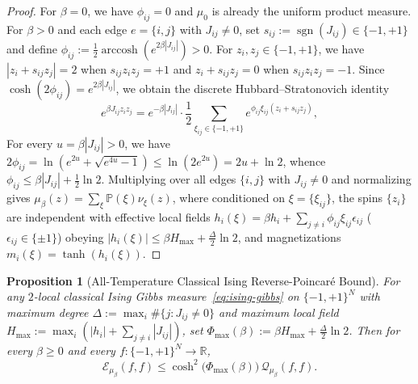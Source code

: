 \documentclass[11pt,a4paper]{article}
\numberwithin{equation}{section}
\theoremstyle{plain}
\newtheorem{proposition}[theorem]{Proposition}
\theoremstyle{definition}
\newcommand{\sgn}{\operatorname{sgn}}
\begin{document}
\begin{proof}
For $\beta = 0$, we have $\phi_{ij} = 0$ and $\mu_0$ is already the uniform product measure. For $\beta > 0$ and each edge $e = \{i,j\}$ with $J_{ij}\ne 0$, set $s_{ij} := \sgn(J_{ij})\in\{-1,+1\}$ and define $\phi_{ij} := \frac{1}{2}\operatorname{arccosh}(e^{2\beta|J_{ij}|}) > 0$. For $z_i,z_j\in\{-1,+1\}$, we have $|z_i + s_{ij}z_j| = 2$ when $s_{ij}z_i z_j = +1$ and $z_i + s_{ij}z_j = 0$ when $s_{ij}z_i z_j = -1$. Since $\cosh(2\phi_{ij}) = e^{2\beta|J_{ij}|}$, we obtain the discrete Hubbard--Stratonovich identity
\[
  e^{\beta J_{ij} z_i z_j}
  = e^{-\beta|J_{ij}|}\cdot \frac{1}{2}\sum_{\xi_{ij}\in\{-1,+1\}} e^{\phi_{ij}\xi_{ij}(z_i + s_{ij}z_j)},
\]
For every $u = \beta|J_{ij}| > 0$, we have $2\phi_{ij} = \ln(e^{2u}+\sqrt{e^{4u}-1}) \le \ln(2e^{2u}) = 2u + \ln 2$, whence $\phi_{ij} \le \beta|J_{ij}| + \frac{1}{2}\ln 2$. Multiplying over all edges $\{i,j\}$ with $J_{ij}\ne 0$ and normalizing gives $\mu_\beta(z) = \sum_\xi \mathbb{P}(\xi)\nu_\xi(z)$, where conditioned on $\xi = \{\xi_{ij}\}$, the spins $\{z_i\}$ are independent with effective local fields $h_i(\xi) = \beta h_i + \sum_{j\ne i} \phi_{ij}\xi_{ij}\epsilon_{ij}$ ($\epsilon_{ij}\in\{\pm 1\}$) obeying $|h_i(\xi)| \le \beta H_{\max} + \frac{\Delta}{2}\ln 2$, and magnetizations $m_i(\xi) = \tanh(h_i(\xi))$.
\end{proof}

\begin{proposition}[All-Temperature Classical Ising Reverse-Poincar\'e Bound]\label{prop:ising}
For any $2$-local classical Ising Gibbs measure~\eqref{eq:ising-gibbs} on $\{-1,+1\}^N$ with maximum degree $\Delta := \max_i \#\{j: J_{ij}\ne 0\}$ and maximum local field $H_{\max} := \max_i(|h_i|+\sum_{j\ne i}|J_{ij}|)$, set $\Phi_{\max}(\beta) := \beta H_{\max} + \frac{\Delta}{2}\ln 2$. Then for every $\beta\ge 0$ and every $f:\{-1,+1\}^N\to\mathbb{R}$,
\begin{equation}\label{eq:ising-rp}
  \mathcal{E}_{\mu_\beta}(f,f)
  \le \cosh^2\!\bigl(\Phi_{\max}(\beta)\bigr)\,\mathcal{Q}_{\mu_\beta}(f,f).
\end{equation}
\end{proposition}
\end{document}
